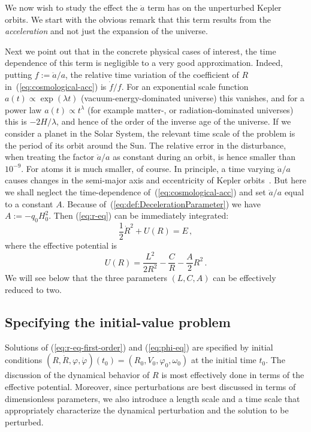 \documentclass
[rmp,aps,twocolumn,showpacs,preprintnumbers,amsmath,amssymb]{revtex4}
\theoremstyle{plain}
\theoremstyle{definition}
\theoremstyle{remark}
\begin{document}
We now wish to study the effect the $\ddot a$ term has on the unperturbed 
Kepler orbits. We start with the obvious remark that this term results 
from the \emph{acceleration} and not just the expansion of the universe. 

Next we point out that in the concrete physical cases 
of interest, the time dependence of this term is negligible to a very 
good approximation. Indeed, putting $f:=\ddot{a}/a$, the relative time 
variation of the coefficient of $R$ in~(\ref{eq:cosmological-acc}) is 
$\dot{f}/f$. For an exponential scale function $a(t)\propto\exp(\lambda t)$ 
(vacuum-energy-dominated universe) this vanishes, and for a power law
$a(t)\propto t^\lambda$ (for example matter-, or 
radiation-dominated universes) this is $-2H/\lambda$, and hence of 
the order of the inverse age of the universe. If we consider a planet 
in the Solar System, the relevant time scale of the problem is the 
period of its orbit around the Sun. The relative error in the 
disturbance, when treating the factor $\ddot{a}/a$ as constant during 
an orbit, is hence smaller than $10^{-9}$. For atoms it is much smaller, 
of course. In principle, 
a time varying $\ddot{a}/a$ causes changes in the semi-major 
axis and eccentricity of Kepler orbits~\cite{Sereno.Jetzer:2007}.
But here we shall neglect the time-dependence of~(\ref{eq:cosmological-acc})
and set $\ddot{a}/a$ equal to a constant $A$. Because 
of~(\ref{eq:def:DecelerationParameter}) we have $A:=-q_0H_0^2$.
Then (\ref{eq:r-eq}) can be immediately integrated: 
%
\begin{equation}\label{eq:r-eq-first-order}
\frac{1}{2}\dot{R}^2 + U(R) = E\,,
\end{equation}
%
where the effective potential is 
%
\begin{equation}\label{eq:potential}
U(R)=\frac{L^2}{2R^2}-\frac{C}{R}-\frac{A}{2}R^2 \,.
\end{equation}
%
We will see below that the three parameters $(L,C,A)$ can 
be effectively reduced to two. 


\subsection{Specifying the initial-value problem}
\label{sec:SpecifyingIVP}
%
Solutions of (\ref{eq:r-eq-first-order}) and (\ref{eq:phi-eq}) 
are specified by initial conditions 
$(R,\dot R,\varphi,\dot \varphi)(t_0)=(R_0,V_0,\varphi_0,\omega_0)$ 
at the initial time $t_0$. The discussion of the dynamical behavior of $R$ 
is most effectively done in terms of the effective potential. Moreover, 
since perturbations are best discussed in terms of dimensionless parameters, 
we also introduce a length scale and a time scale that appropriately 
characterize the dynamical perturbation and the solution to be perturbed. 
\end{document}

